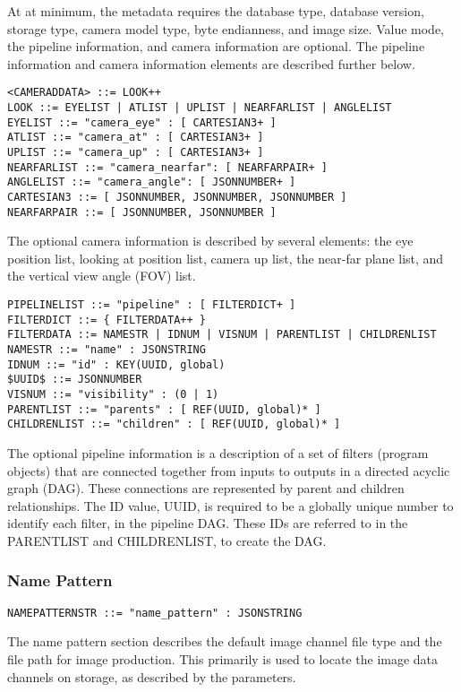 At at minimum, the metadata requires the database type,
database version, storage type, camera model type, byte
endianness, and image size.
Value mode, the pipeline information, and camera information
are optional. The
pipeline information and camera information elements
are described further below.

\begin{verbatim}
<CAMERADDATA> ::= LOOK++
LOOK ::= EYELIST | ATLIST | UPLIST | NEARFARLIST | ANGLELIST
EYELIST ::= "camera_eye" : [ CARTESIAN3+ ]
ATLIST ::= "camera_at" : [ CARTESIAN3+ ]
UPLIST ::= "camera_up" : [ CARTESIAN3+ ]
NEARFARLIST ::= "camera_nearfar": [ NEARFARPAIR+ ]
ANGLELIST ::= "camera_angle": [ JSONNUMBER+ ]
CARTESIAN3 ::= [ JSONNUMBER, JSONNUMBER, JSONNUMBER ]
NEARFARPAIR ::= [ JSONNUMBER, JSONNUMBER ]
\end{verbatim}

The optional camera information is described by several
elements: the eye position list, looking at position list,
camera up list, the near-far plane list, and the 
vertical view angle (FOV) list.  

\begin{verbatim}
PIPELINELIST ::= "pipeline" : [ FILTERDICT+ ]
FILTERDICT ::= { FILTERDATA++ }
FILTERDATA ::= NAMESTR | IDNUM | VISNUM | PARENTLIST | CHILDRENLIST
NAMESTR ::= "name" : JSONSTRING
IDNUM ::= "id" : KEY(UUID, global)
$UUID$ ::= JSONNUMBER
VISNUM ::= "visibility" : (0 | 1)
PARENTLIST ::= "parents" : [ REF(UUID, global)* ]
CHILDRENLIST ::= "children" : [ REF(UUID, global)* ]
\end{verbatim}

The optional pipeline information is a description
of a set of filters (program objects)
that are connected together from inputs
to outputs in a directed acyclic graph (DAG).
These connections are
represented by parent and children relationships.
The ID value, UUID, is required to be a globally
unique number to identify each filter, in
the pipeline DAG. These IDs are referred to 
in the PARENTLIST and CHILDRENLIST, to create the DAG.

\subsubsection{Name Pattern}

\begin{verbatim}
NAMEPATTERNSTR ::= "name_pattern" : JSONSTRING
\end{verbatim}

The name pattern section describes
the default image channel file type and the file path for
image production. This primarily is used to locate
the image data channels on storage,
as described by the parameters.


